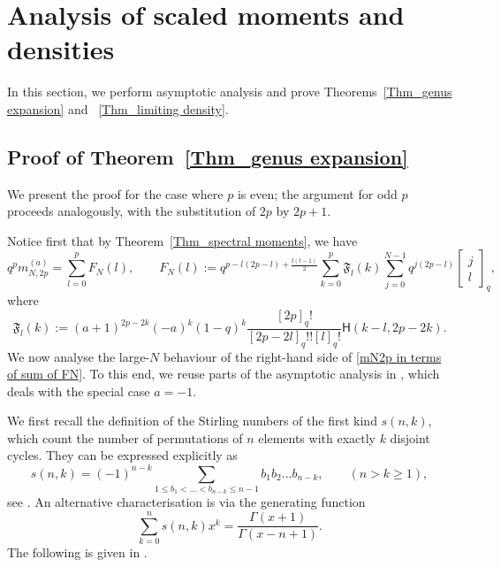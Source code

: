 \documentclass{amsart}
\newcommand{\qbinom}[2]{{\begin{bmatrix}#1\\#2\end{bmatrix}}_q}
\theoremstyle{plain}
\theoremstyle{remark}
\numberwithin{equation}{section}
\begin{document}
\bigskip 


\section{Analysis of scaled moments and densities} \label{Section_largeN asymptotic}

In this section, we perform asymptotic analysis and prove Theorems~\ref{Thm_genus expansion} and ~\ref{Thm_limiting density}.

\subsection{Proof of Theorem~\ref{Thm_genus expansion}}

We present the proof for the case where $p$ is even; the argument for odd $p$ proceeds analogously, with the substitution of $2p$ by $2p+1$. 

Notice first that by Theorem~\ref{Thm_spectral moments}, we have 
\begin{equation} \label{mN2p in terms of sum of FN}
   q^{p} m_{N,2p}^{(a)}=\sum_{l=0}^{p}F_{N}(l), \qquad F_N(l):=q^{p-l(2p-l)+\frac{l(l-1)}{2}}\sum_{k=0}^{p}\mathfrak{F}_{l}(k)\sum_{j=0}^{N-1}q^{j(2p-l)}\qbinom{j}{l},
\end{equation}
where 
\begin{equation} \label{def of mathfrak Fl(k)}
\mathfrak{F}_{l}(k)   :=(a+1)^{2p-2k}(-a)^{k}(1-q)^{k}\frac{[2p]_{q}!}{[2p-2l]_{q}!![l]_{q}!}\mathsf{H}(k-l,2p-2k). 
\end{equation} 
We now analyse the large-$N$ behaviour of the right-hand side of \eqref{mN2p in terms of sum of FN}. To this end, we reuse parts of the asymptotic analysis in \cite{BFO24}, which deals with the special case $a = -1$.
 

We first recall the definition of the Stirling numbers of the first kind \( s(n,k) \), which count the number of permutations of \( n \) elements with exactly \( k \) disjoint cycles. They can be expressed explicitly as 
\begin{equation} \label{def of Stirling number}
s(n,k) = (-1)^{n-k} \sum_{ 1 \le b_1 <  \dots < b_{n-k} \le n-1 } b_1 b_2 \dots b_{n-k}, \qquad (n > k \ge 1), 
\end{equation}
see \cite[Section~26.8]{NIST}.  
An alternative characterisation is via the generating function \cite[Eq.~(26.8.7)]{NIST}
\begin{equation}
\sum_{k=0}^n s(n,k)x^k = \frac{ \Gamma(x+1) }{ \Gamma(x-n+1) }.  
\end{equation} 
The following is given in \cite[Lemma 4.3]{BFO24}.
\end{document}
